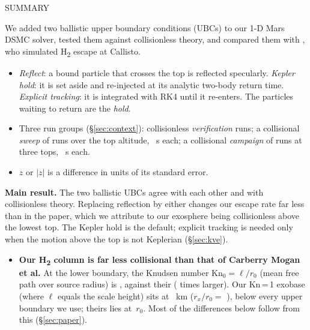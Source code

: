\documentclass[10pt]{article}
\newcommand{\Htwo}{H\textsubscript{2}}
\begin{document}
\begin{tcolorbox}[enhanced, breakable, sharp corners, frame hidden, colback=white,
  borderline west={1.2pt}{0pt}{lightgrey}, left=12pt, right=2pt, top=2pt, bottom=2pt,
  before skip=6pt, after skip=4pt]
{\footnotesize\ttfamily\color{grey}SUMMARY}\par\vspace{3pt}
\small
We added two ballistic upper boundary conditions (UBCs) to our 1-D Mars DSMC solver, tested them against collisionless theory, and compared them with \citet{cm21}, who simulated \Htwo{} escape at Callisto.
\begin{itemize}[leftmargin=1.1em, itemsep=1pt, topsep=2pt]
  \item \emph{Reflect}: a bound particle that crosses the top is reflected specularly. \emph{Kepler hold}: it is set aside and re-injected at its analytic two-body return time. \emph{Explicit tracking}: it is integrated with RK4 until it re-enters. The particles waiting to return are the \emph{hold}.
  \item Three run groups (\S\ref{sec:context}): \verNHoldRuns{} collisionless \emph{verification} runs; a collisional \emph{sweep} of \nSweepTotal{} runs over the top altitude, \sweepTend{}~s each; a collisional \emph{campaign} of \campNtotal{} runs at three tops, \campTend{}~s each.
  \item $z$ or $|z|$ is a difference in units of its standard error.
\end{itemize}
\textbf{Main result.} The two ballistic UBCs agree with each other and with collisionless theory. Replacing reflection by either changes our escape rate far less than in the paper, which we attribute to our exosphere being collisionless above the lowest top. The Kepler hold is the default; explicit tracking is needed only when the motion above the top is not Keplerian (\S\ref{sec:kve}).
\begin{itemize}[leftmargin=1.1em, itemsep=3pt]
  \item \textbf{Our \Htwo{} column is far less collisional than that of Carberry Mogan et al.} At the lower boundary, the Knudsen number $\mathrm{Kn}_0 = \ell/r_0$ (mean free path over source radius) is \oKnZero{}, against their \pKnZero{} (\oKnRatio{} times larger). Our Kn\,=\,1 exobase (where $\ell$ equals the scale height) sits at \exoZReflectKn{}~km ($r_x/r_0 = $ \exoRReflectKn{}), below every upper boundary we use; theirs lies at \pExoKnReflect{}\,$r_0$. Most of the differences below follow from this (\S\ref{sec:paper}).

\end{itemize}
\end{tcolorbox}
\end{document}
